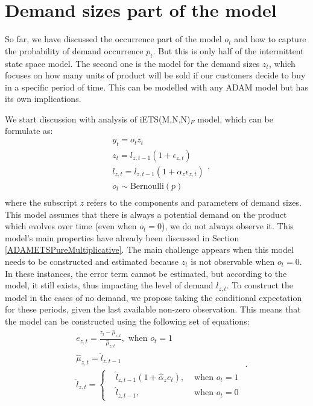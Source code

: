 \documentclass[
]{book}
\theoremstyle{definition}
\theoremstyle{definition}
\theoremstyle{definition}
\theoremstyle{definition}
\theoremstyle{remark}
\begin{document}
\hypertarget{ADAMDemandSizes}{%
\section{Demand sizes part of the model}\label{ADAMDemandSizes}}

So far, we have discussed the occurrence part of the model \(o_t\) and how to capture the probability of demand occurrence \(p_t\). But this is only half of the intermittent state space model. The second one is the model for the demand sizes \(z_t\), which focuses on how many units of product will be sold if our customers decide to buy in a specific period of time. This can be modelled with any ADAM model but has its own implications.

We start discussion with analysis of iETS(M,N,N)\(_F\) model, which can be formulate as:
\begin{equation}
    \begin{aligned}
        & y_t = o_t z_t  \\
        & z_t = l_{z,t-1}(1 + \epsilon_{z,t}) \\
        & l_{z,t} = l_{z,t-1}(1  + \alpha_{z} \epsilon_{z,t}) \\
        & o_t \sim \text{Bernoulli}(p) \\
    \end{aligned},
    \label{eq:iETSMNNFixed}
\end{equation}
where the subscript \(z\) refers to the components and parameters of demand sizes. This model assumes that there is always a potential demand on the product which evolves over time (even when \(o_t=0\)), we do not always observe it. This model's main properties have already been discussed in Section \ref{ADAMETSPureMultiplicative}. The main challenge appears when this model needs to be constructed and estimated because \(z_t\) is not observable when \(o_t=0\). In these instances, the error term cannot be estimated, but according to the model, it still exists, thus impacting the level of demand \(l_{z,t}\). To construct the model in the cases of no demand, we propose taking the conditional expectation for these periods, given the last available non-zero observation. This means that the model can be constructed using the following set of equations:
\begin{equation}
    \begin{aligned}
        & e_{z,t} = \frac{z_t -\hat{\mu}_{z,t}}{\hat{\mu}_{z,t}}, \text{ when } o_t=1 \\
        & \hat{\mu}_{z,t} = \hat{l}_{z,t-1} \\
        & \hat{l}_{z,t} = 
        \left \lbrace \begin{aligned}
                  & \hat{l}_{z,t-1} (1 + \hat{\alpha}_z e_t ), & \text{ when } o_t=1 \\
                  & \hat{l}_{z,t-1} , & \text{ when } o_t=0
            \end{aligned} \right.
    \end{aligned}.
    \label{eq:iETSMNNFixedConstruction}
\end{equation}
\end{document}
